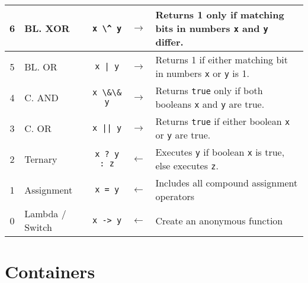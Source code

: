 \documentclass{article}
\begin{document}
\begin{center}
\begin{tabularx}{\textwidth}{clccX}
                  6   & BL. XOR           & \lstinline|x \^ y|    & \(\to\) & Returns 1 only if matching bits in numbers \lstinline|x| and \lstinline|y| differ.\\\midrule
                  5   & BL. OR            & \lstinline+x | y+     & \(\to\) & Returns 1 if either matching bit in numbers \lstinline|x| or \lstinline|y| is 1.\\\midrule
                  4   & C. AND            & \lstinline|x \&\& y|  & \(\to\) & Returns \lstinline|true| only if both booleans \lstinline|x| and \lstinline|y| are true.\\\midrule
                  3   & C. OR             & \lstinline+x || y+    & \(\to\) & Returns \lstinline|true| if either boolean \lstinline|x| or \lstinline|y| are true.\\\midrule
                  2   & Ternary           & \lstinline|x ? y : z| & \(\gets\) & Executes \lstinline|y| if boolean \lstinline|x| is true, else executes \lstinline|z|.\\\midrule
                  1   & Assignment        & \lstinline!x = y!     & \(\gets\) & Includes all compound assignment operators \\\midrule
                  0   & Lambda / Switch   & \lstinline|x -> y|    & \(\gets\) & Create an anonymous function\\\bottomrule
\end{tabularx}\end{center}

\section{Containers}
\end{document}
